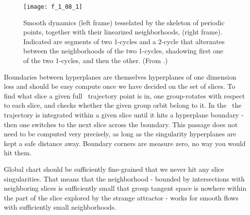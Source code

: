  \begin{figure}
 \texttt{[image: f\_1\_08\_1]}
 \caption{\label{fig:Tesselate}
Smooth dynamics  (left frame) tesselated by the skeleton of
periodic points, together with their linearized neighborhoods,
(right frame).
Indicated are segments of two 1-cycles and a 2-cycle that
alternates between the neighborhoods of the two 1-cycles,
shadowing first one of the two 1-cycles, and then the other.
(From \wwwcb{}.)
  }\end{figure}
%


Boundaries
between hyperplanes are themselves hyperplanes of one dimension less and
should be easy compute once we have decided on the set of slices. To find
what slice a given full \statesp\ trajectory point is in, one group-rotates
with respect to each slice, and checks whether the given group orbit
belong to it. In the \reducedsp\ the trajectory is integrated within a
given slice until it hits a hyperplane boundary - then one switches to
the next slice across the boundary. This passage does not need to
be computed very precisely, as long as the singularity
hyperplanes are kept a safe distance away. Boundary corners are measure zero, no
way you would hit them.

Global chart should be sufficiently fine-grained that we never hit any
slice singularities. That means that the neighborhood - bounded by
intersections with neighboring slices is sufficiently small that group
tangent space is nowhere within the part of the slice explored by
the strange attractor - works for smooth flows
with sufficiently small neighborhoods.


%
